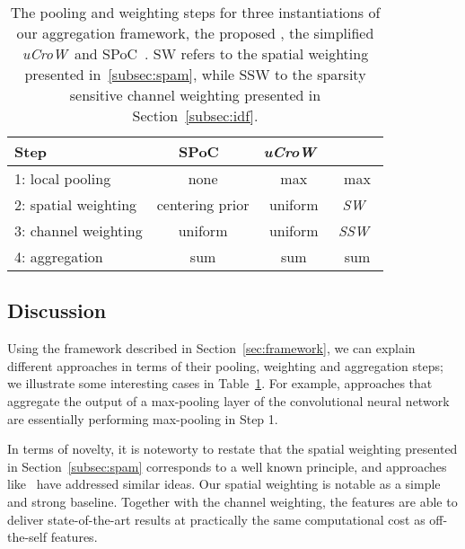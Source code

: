 \documentclass[runningheads]{llncs}
\newcommand{\uCrow}{\textit{uCroW}~}
\newcommand{\sCrow}{\textit{SW}~} \newcommand{\cCrow}{\textit{SSW}~}
\begin{document}
\begin{table}[t]
\setlength{\tabcolsep}{12pt}
\small {
	\begin{tabularx}{\columnwidth}{X c c c}
  		Step & SPoC~\cite{BaLe15} & \uCrow & \Crow \\
  		\midrule
  		1: local pooling & none & max & max \\
  		2: spatial weighting & centering prior & uniform & \sCrow \\
  		3: channel weighting & uniform & uniform & \cCrow \\
        4: aggregation & sum & sum & sum
	\end{tabularx}
}
\vspace{.15cm}
\caption{The pooling and weighting steps for three instantiations of our aggregation framework, \ie the proposed \Crow, the simplified \uCrow and SPoC~\cite{BaLe15}. SW refers to the spatial weighting presented in~\ref{subsec:spam}, while SSW to the sparsity sensitive channel weighting presented in Section~\ref{subsec:idf}.}
\label{tab:spocsup}
\end{table}










 



\subsection{Discussion}
\label{subsec:discussion}



\noindent


Using the framework described in Section~\ref{sec:framework}, we can explain different approaches in terms of their pooling, weighting and aggregation steps; we illustrate some interesting cases in Table~\ref{tab:spocsup}.
For example, approaches that aggregate the output of a max-pooling layer of the convolutional neural network are essentially performing max-pooling in Step 1.



In terms of novelty, it is noteworty to restate that the spatial weighting presented in Section~\ref{subsec:spam} corresponds to a well known principle, and approaches like~\cite{JeZi14, MuPe14, CiMV15} have addressed similar ideas. Our spatial weighting is notable as a simple and strong baseline. Together with the channel weighting, the \Crow features are able to deliver state-of-the-art results at practically the same computational cost as off-the-self features.
 
\end{document}
